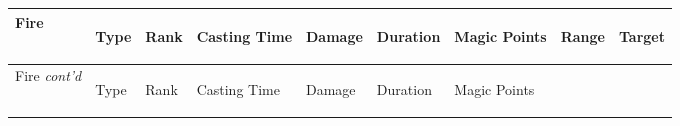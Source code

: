 \documentclass[twoside]{book}
\begin{document}
\begin{longtable}{p{1.25in}lp{2em}p{3em}llp{7em}ll} 
  Fire
  &
  \begin{turn}{70}{Type}\end{turn}
          
  &
  \begin{turn}{70}{Rank}\end{turn}
          
  &
  \begin{turn}{70}{Casting Time}\end{turn}
          
  &
  \begin{turn}{70}{Damage}\end{turn}
          
  &
  \begin{turn}{70}{Duration}\end{turn}
          
  &
  \begin{turn}{70}{Magic Points}\end{turn}
          
  &
  \begin{turn}{70}{Range}\end{turn}
          
  &
  \begin{turn}{70}{Target}\end{turn}
          
  \\
  \hline
  \hline
  \endfirsthead
  Fire \textit{cont'd}
        
  &
  \begin{turn}{70}{Type}\end{turn}
          
  &
  \begin{turn}{70}{Rank}\end{turn}
          
  &
  \begin{turn}{70}{Casting Time}\end{turn}
          
  &
  \begin{turn}{70}{Damage}\end{turn}
          
  &
  \begin{turn}{70}{Duration}\end{turn}
          
  &
  \begin{turn}{70}{Magic Points}\end{turn}
          

\end{longtable}
\end{document}
